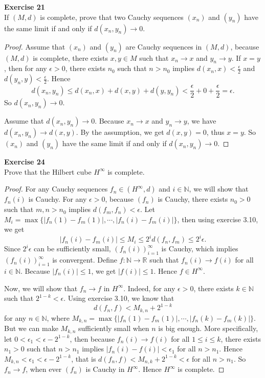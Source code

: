\documentclass[12pt, a4paper]{article}
\theoremstyle{plain}
\newcommand{\N}{\mathbb{N}}
\newcommand{\R}{\mathbb{R}}
\newenvironment{exercise}[2][Exercise]
    { \begin{mdframed}[backgroundcolor=gray!20] \textbf{#1 #2} \\}
    {  \end{mdframed}}
\begin{document}
\begin{exercise}{21}
If $(M,d)$ is complete, prove that two Cauchy sequences $(x_n)$ and $(y_n)$ have the same limit if and only if $d(x_n,y_n)\rightarrow 0$.
\end{exercise}
	\begin{proof}
	Assume that $(x_n)$ and $(y_n)$ are Cauchy sequences in $(M,d)$, because $(M,d)$ is complete, there exists $x,y\in M$ such that $x_n\rightarrow x$ and $y_n\rightarrow y$. If $x=y$, then for any $\epsilon>0$, there exists $n_0$ such that $n>n_0$ implies $d(x_n,x)<\frac{\epsilon}{2}$ and $d(y_n,y)<\frac{\epsilon}{2}$. Hence
	\[
	d(x_n,y_n)\leq d(x_n,x)+d(x,y)+d(y,y_n)<\frac{\epsilon}{2}+0+\frac{\epsilon}{2}=\epsilon.
	\]
	So $d(x_n,y_n)\rightarrow 0$.
	
	Assume that $d(x_n,y_n)\rightarrow 0$. Because $x_n\rightarrow x$ and $y_n\rightarrow y$, we have $d(x_n,y_n)\rightarrow d(x,y)$. By the assumption, we get $d(x,y)=0$, thus $x=y$. So $(x_n)$ and $(y_n)$ have the same limit if and only if $d(x_n,y_n)\rightarrow 0$.
	\end{proof}

\begin{exercise}{24}
Prove that the Hilbert cube $H^\infty$ is complete.
\end{exercise}
	\begin{proof}
	For any Cauchy sequences $f_n\in (H^{\infty},d)$ and $i\in\N$, we will show that $f_n(i)$ is Cauchy. For any $\epsilon>0$, because $(f_n)$ is Cauchy, there exists $n_0>0$ such that $m,n>n_0$ implies $d(f_m,f_n)<\epsilon$. Let $M_i=\max\{|f_n(1)-f_m(1)|,\cdots,|f_n(i)-f_m(i)|\}$, then using exercise 3.10, we get
	\[
	|f_n(i)-f_m(i)|\leq M_i\leq 2^{i}d(f_n,f_m)\leq 2^i\epsilon.
	\]
	Since $2^i\epsilon$ can be sufficiently small, $(f_n(i))_{i=1}^\infty$ is Cauchy, which implies $(f_n(i))_{i=1}^\infty$ is convergent. Define $f:\N\rightarrow\R$ such that $f_n(i)\rightarrow f(i)$ for all $i\in\N$. Because $|f_n(i)|\leq 1$, we get $|f(i)|\leq 1$. Hence $f\in H^\infty$. 
	
	Now, we will show that $f_n\rightarrow f$ in $H^\infty$. Indeed, for any $\epsilon>0$, there exists $k\in\N$ such that $2^{1-k}<\epsilon$. Using exercise 3.10, we know that
	\[
	d(f_n,f)<M_{k,n} + 2^{1-k}
	\]
	for any $n\in\N$, where $M_{k,n}=\max\{|f_n(1)-f_m(1)|,\cdots,|f_n(k)-f_m(k)|\}$. But we can make $M_{k,n}$ sufficiently small when $n$ is big enough. More specifically, let $0<\epsilon_1< \epsilon-2^{1-k}$, then because $f_n(i)\rightarrow f(i)$ for all $1\leq i\leq k$, there exists $n_1>0$ such that $n>n_1$ implies $|f_n(i)-f(i)|<\epsilon_1$ for all $n>n_1$. Hence $M_{k,n}<\epsilon_1<\epsilon-2^{1-k}$, that is $d(f_n,f)<M_{n,k}+2^{1-k}<\epsilon$ for all $n>n_1$. So $f_n\rightarrow f$, when ever $(f_n)$ is Cauchy in $H^\infty$. Hence $H^\infty$ is complete.
	\end{proof}
\end{document}
